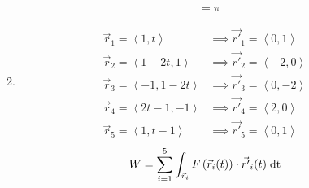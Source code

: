 \documentclass[12pt]{article}
\begin{document}
\begin{enumerate}
\begin{enumerate}
\begin{center}
\begin{align*}
                &=\boxed{\pi}
            \end{align*}
        \end{center}
        \newpage
        \item 
        \vspace{-10pt}
        \begin{align*}
            \Vec{r}_1=\left<1,t\right>&\implies\Vec{r'}_1=\left<0,1\right>\\
            \Vec{r}_2=\left<1-2t,1\right>&\implies\Vec{r'}_2=\left<-2,0\right>\\
            \Vec{r}_3=\left<-1,1-2t\right>&\implies\Vec{r'}_3=\left<0,-2\right>\\
            \Vec{r}_4=\left<2t-1,-1\right>&\implies\Vec{r'}_4=\left<2,0\right>\\
            \Vec{r}_5=\left<1,t-1\right>&\implies\Vec{r'}_5=\left<0,1\right>
        \end{align*}
        \begin{align*}
            W&=\sum_{i=1}^5\int_{\Vec{r}_i}F\left(\Vec{r}_i(t)\right)\cdot\Vec{r'}_i(t)\;{\rm dt}\\

\end{align*}
\end{enumerate}
\end{enumerate}
\end{document}
